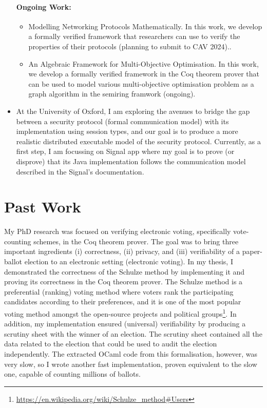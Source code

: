 \documentclass[a4paper]{article}
\begin{document}
\begin{itemize}
 
\paragraph{Ongoing Work:} 
\begin{itemize}
\item Modelling Networking Protocols Mathematically. In this work, we develop 
a formally verified framework that researchers can use to verify 
the properties of their protocols (planning to submit to CAV 2024).. 


\item An Algebraic Framework for Multi-Objective Optimisation. In this work, we develop 
a formally verified framework in the Coq theorem prover that can be used to model 
various multi-objective optimisation problem as a graph algorithm in the semiring framwork (ongoing).
\end{itemize}	

\item At the University of Oxford, I am exploring the avenues to bridge the gap between a security protocol 
(formal communication model) with its implementation using session types, and our 
goal is to produce a more realistic distributed executable model of the security protocol. 
Currently, as a first step, I am focussing on Signal app 
where my goal is to prove (or disprove) that its Java implementation follows the 
communication model described in the Signal's documentation. 
\end{itemize}



\section{Past Work}
My PhD research was focused on verifying electronic voting, specifically vote-counting schemes, in 
the Coq theorem prover. The goal was to 
bring  three important ingredients (i) correctness, (ii) privacy, and (iii) verifiability of a 
paper-ballot election to 
an electronic setting (electronic voting).
In my thesis, I demonstrated the correctness of the Schulze method 
by implementing it and proving its correctness in the Coq theorem 
prover. The Schulze method is a preferential (ranking) voting method where voters rank the participating 
candidates according to their preferences, and it is one of the most popular voting method 
amongst the open-source projects and 
political groups\footnote{\url{https://en.wikipedia.org/wiki/Schulze_method#Users}}.
In addition, my implementation 
ensured (universal) verifiability by producing a scrutiny sheet 
with the winner of an election. The scrutiny sheet contained all the data related 
to the election that could be used to audit the election independently. 
The extracted OCaml code from this formalisation, however, was 
very slow, so I wrote another fast implementation, proven equivalent to the slow one,
capable of counting millions of ballots.
\end{document}
